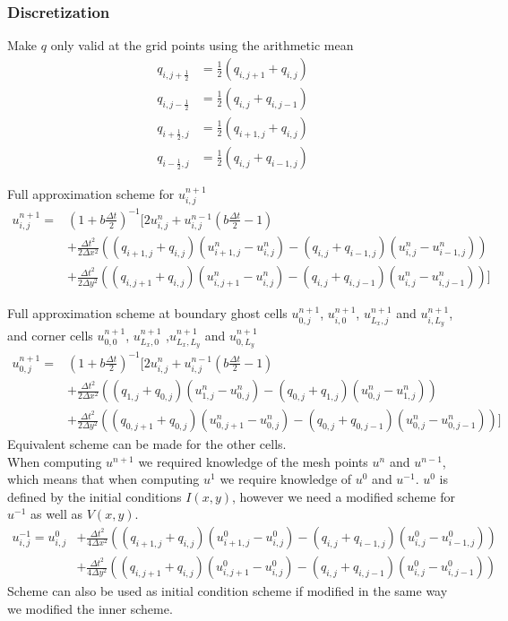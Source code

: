 \documentclass[11pt]{article}
\begin{document}
		\subsubsection*{Discretization}
		Make $q$ only valid at the grid points using the arithmetic mean
		\begin{align*}
		q_{i,j+\frac{1}{2}} &= \frac{1}{2}(q_{i,j+1} + q_{i,j}) \\
		q_{i,j-\frac{1}{2}} &= \frac{1}{2}(q_{i,j} + q_{i,j-1}) \\
		q_{i+\frac{1}{2},j} &= \frac{1}{2}(q_{i+1,j} + q_{i,j}) \\
		q_{i-\frac{1}{2},j} &= \frac{1}{2}(q_{i,j} + q_{i-1,j}) 
		\end{align*}
		
		Full approximation scheme for $u^{n+1}_{i,j}$
		\begin{align*}
		u^{n+1}_{i,j} = & \left(1 + b\frac{\Delta t}{2}\right)^{-1} 
		\biggl[2u^{n}_{i,j}+u^{n-1}_{i,j}\left(b\frac{\Delta t}{2}-1\right) \\
		& +\frac{\Delta t^2}{2\Delta x^2}((q_{i+1,j} + q_{i,j})
		(u^n_{i+1,j}-u^n_{i,j})-(q_{i,j} + q_{i-1,j})
		(u^n_{i,j}-u^n_{i-1,j})) \\
		& +\frac{\Delta t^2}{2\Delta y^2}((q_{i,j+1} + q_{i,j})
		(u^n_{i,j+1}-u^n_{i,j})-(q_{i,j} + q_{i,j-1})
		(u^n_{i,j}-u^n_{i,j-1})) \biggr]
		\end{align*}
		
		Full approximation scheme at boundary ghost cells 
		$u^{n+1}_{0,j}$, $u^{n+1}_{i,0}$, $u^{n+1}_{L_x,j}$ and 
		$u^{n+1}_{i,L_y}$, and corner cells $u^{n+1}_{0,0}$, $u^{n+1}_{L_x,0}$
		,$u^{n+1}_{L_x,L_y}$ and $u^{n+1}_{0,L_y}$
		\begin{align*}
		u^{n+1}_{0,j} = & \left(1 + b\frac{\Delta t}{2}\right)^{-1} 
		\biggl[2u^{n}_{i,j}+u^{n-1}_{i,j}\left(b\frac{\Delta t}{2}-1\right) \\
		& +\frac{\Delta t^2}{2\Delta x^2}((q_{1,j} + q_{0,j})
		(u^n_{1,j}-u^n_{0,j})-(q_{0,j} + q_{1,j})
		(u^n_{0,j}-u^n_{1,j})) \\
		& +\frac{\Delta t^2}{2\Delta y^2}((q_{0,j+1} + q_{0,j})
		(u^n_{0,j+1}-u^n_{0,j})-(q_{0,j} + q_{0,j-1})
		(u^n_{0,j}-u^n_{0,j-1})) \biggr]
		\end{align*}
		Equivalent scheme can be made for the other cells.\\
		When computing $u^{n+1}$ we required knowledge of the mesh points
		$u^{n}$ and $u^{n-1}$, which means that when computing $u^{1}$ 
		we require knowledge of $u^{0}$ and $u^{-1}$. $u^{0}$ is defined 
		by the initial conditions $I(x,y)$, however
		we need a modified scheme for $u^{-1}$ as well as $V(x,y)$.
		\begin{align*}
		u^{-1}_{i,j} = u^{0}_{i,j}
		& +\frac{\Delta t^2}{4\Delta x^2}((q_{i+1,j} + q_{i,j})
		(u^0_{i+1,j}-u^0_{i,j})-(q_{i,j} + q_{i-1,j})
		(u^0_{i,j}-u^0_{i-1,j})) \\
		& +\frac{\Delta t^2}{4\Delta y^2}((q_{i,j+1} + q_{i,j})
		(u^0_{i,j+1}-u^0_{i,j})-(q_{i,j} + q_{i,j-1})
		(u^0_{i,j}-u^0_{i,j-1}))
		\end{align*}
		Scheme can also be used as initial condition scheme if modified
		in the same way we modified the inner scheme.
		
\end{document}
